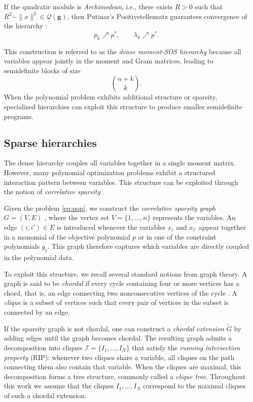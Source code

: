 \documentclass[11pt,a4paper]{article}
\theoremstyle{definition}
\begin{document}
If the quadratic module is \emph{Archimedean}, i.e., there exists
$R>0$ such that $R^2-\|x\|^2\in\mathcal{Q}(\mathbf{g})$,
then Putinar's Positivstellensatz guarantees convergence of the
hierarchy \cite{Lasserre2001}:
\begin{equation}
p_k \nearrow p^*, \qquad \lambda_k \nearrow p^* .
\end{equation}

This construction is referred to as the \emph{dense moment-SOS hierarchy}
because all variables appear jointly in the moment and Gram matrices,
leading to semidefinite blocks of size
\[
\binom{n+k}{k}.
\]
When the polynomial problem exhibits additional structure or sparsity,
specialized hierarchies can exploit this structure to produce
smaller semidefinite programs.


\subsection{Sparse hierarchies}

The dense hierarchy couples all variables together in a single moment
matrix. However, many polynomial optimization problems exhibit a
structured interaction pattern between variables. This structure can be
exploited through the notion of \emph{correlative sparsity} \cite{fukuda2001exploiting,kim2009generalized}.

Given the problem \eqref{eq:pop}, we construct the
\emph{correlative sparsity graph} $G=(V,E)$ \cite{Waki2006}, where the vertex set
$V=\{1,\dots,n\}$ represents the variables.
An edge $(i,i')\in E$ is introduced whenever the variables $x_i$ and
$x_{i'}$ appear together in a monomial of the objective polynomial $p$
or in one of the constraint polynomials $g_j$.
This graph therefore captures which variables are directly coupled in
the polynomial data.

To exploit this structure, we recall several standard notions from graph
theory.
A graph is said to be \emph{chordal} if every cycle containing four or
more vertices has a chord, that is, an edge connecting two nonconsecutive
vertices of the cycle \cite{Vandenberghe2015}.
A \emph{clique} is a subset of vertices such that every pair of vertices
in the subset is connected by an edge.

If the sparsity graph is not chordal, one can construct a
\emph{chordal extension} $\widetilde G$ by adding edges until the graph
becomes chordal.
The resulting graph admits a decomposition into cliques
$\mathcal{I}=\{I_1,\dots,I_N\}$ that satisfy the
\emph{running intersection property} (RIP): whenever two cliques share a
variable, all cliques on the path connecting them also contain that
variable.
When the cliques are maximal, this decomposition forms a tree
structure, commonly called a \emph{clique tree}.
Throughout this work we assume that the cliques
$I_1,\dots,I_N$ correspond to the maximal cliques of such a chordal
extension.
\end{document}
